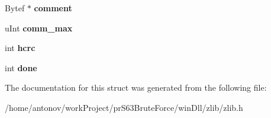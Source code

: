 \begin{DoxyCompactItemize}
Bytef $\ast$ {\bfseries comment}
\item 
\mbox{\label{structgz__header__s_aa0529f45e5c08b3009cfc2a61a86aea0}} 
u\+Int {\bfseries comm\+\_\+max}
\item 
\mbox{\label{structgz__header__s_a29fa8de3acff8d8c7bad61dc924d8564}} 
int {\bfseries hcrc}
\item 
\mbox{\label{structgz__header__s_ab8fd11f59b76a7d031e24bede8679d9d}} 
int {\bfseries done}
\end{DoxyCompactItemize}


The documentation for this struct was generated from the following file\+:\begin{DoxyCompactItemize}
\item 
/home/antonov/work\+Project/pr\+S63\+Brute\+Force/win\+Dll/zlib/zlib.\+h\end{DoxyCompactItemize}
